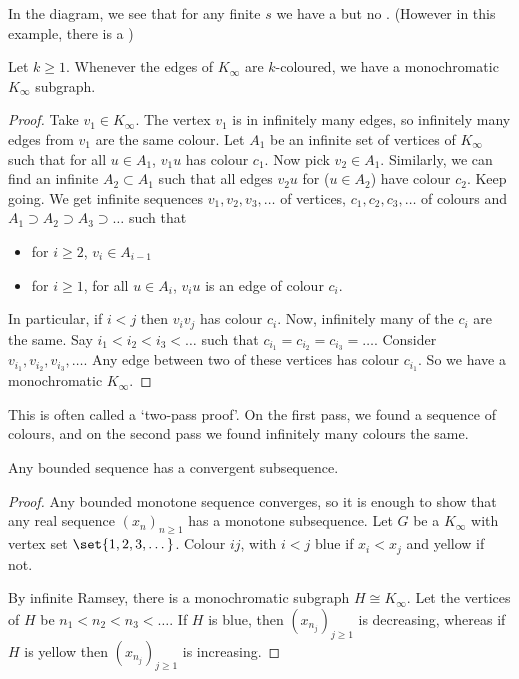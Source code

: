 \documentclass{article}
\begin{document}
In the diagram, we see that for any finite $s$ we have a  but no .
(However in this example, there is a )

\begin{nthm}\label{thm:infRamsey}
    Let $k \geq 1$. Whenever the edges of \hyperlink{def:kInf}{$K_\infty$} are $k$-coloured, we have a monochromatic $K_\infty$ subgraph.
\end{nthm}

\begin{proof}
    Take $v_1 \in K_\infty$.  The vertex $v_1$ is in infinitely many edges, so infinitely many edges from $v_1$ are the same colour.
    Let $A_1$ be an infinite set of vertices of $K_\infty$ such that for all $u \in A_1$, $v_1 u$ has colour $c_1$.
    Now pick $v_2 \in A_1$. Similarly, we can find an infinite $A_2 \subset A_1$ such that all edges $v_2 u$ for ($u \in A_2$) have colour $c_2$.
    Keep going. We get infinite sequences $v_1, v_2, v_3, \dotsc$ of vertices, $c_1, c_2, c_3, \dotsc$ of colours and $A_1 \supset A_2 \supset A_3 \supset \dots$ such that
    \begin{itemize}
        \item for $i \geq 2$, $v_i \in A_{i-1}$
        \item for $i \geq 1$, for all $u \in A_i$, $v_i u$ is an edge of colour $c_i$.
    \end{itemize}
    In particular, if $i < j$ then $v_i v_j$ has colour $c_i$. Now, infinitely many of the $c_i$ are the same.
    Say $i_1 < i_2 < i_3 < \dots$ such that $c_{i_1} = c_{i_2} = c_{i_3} = \dotsc$.
    Consider $v_{i_1}, v_{i_2}, v_{i_3}, \dotsc$. Any edge between two of these vertices has colour $c_{i_1}$. So we have a monochromatic $K_\infty$.
\end{proof}

\begin{remark}
    This is often called a `two-pass proof'. On the first pass, we found a sequence of colours, and on the second pass we found infinitely many colours the same.
\end{remark}

\begin{ncor}
    Any bounded sequence has a convergent subsequence.
\end{ncor}

\begin{proof}
    Any bounded monotone sequence converges, so it is enough to show that any real sequence $(x_n)_{n \geq 1}$ has a monotone subsequence.
    Let $G$ be a $K_\infty$ with vertex set $\set{1, 2, 3, \dotsc}$. Colour $ij$, with $i<j$ blue if $x_i < x_j$ and yellow if not.

    By infinite Ramsey, there is a monochromatic subgraph $H \cong K_\infty$. Let the vertices of $H$ be $n_1 < n_2 < n_3 < \dots$.
    If $H$ is blue, then $(x_{n_j})_{j \geq 1}$ is decreasing, whereas if $H$ is yellow then $(x_{n_j})_{j \geq 1}$ is increasing.
\end{proof}
\end{document}

